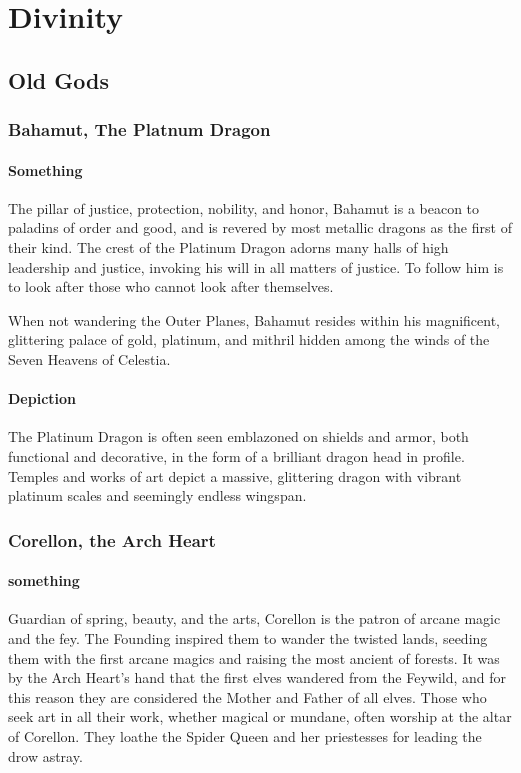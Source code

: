 \documentclass[letterpaper,twocolumn,openany,nodeprecatedcode]{dndbook}
\begin{document}

\section{Divinity}

\subsection{Old Gods}

\subsubsection{Bahamut, The Platnum Dragon}

\paragraph{Something}
The pillar of justice, protection, nobility, and honor, Bahamut is a beacon to
paladins of order and good, and is revered by most metallic dragons as the first of
their kind. The crest of the Platinum Dragon adorns many halls of high leadership and
justice, invoking his will in all matters of justice. To follow him is to look after
those who cannot look after themselves.

When not wandering the Outer Planes, Bahamut resides within his magnificent, glittering
palace of gold, platinum, and mithril hidden among the winds of the Seven Heavens of Celestia.

\paragraph{Depiction}
The Platinum Dragon is often seen emblazoned on shields and armor, both functional and
decorative, in the form of a brilliant dragon head in profile. Temples and works of art
depict a massive, glittering dragon with vibrant platinum scales and seemingly
endless wingspan.

\subsubsection{Corellon, the Arch Heart}

\paragraph{something}
Guardian of spring, beauty, and the arts, Corellon is the patron of arcane magic and
the fey. The Founding inspired them to wander the twisted lands, seeding them with the
first arcane magics and raising the most ancient of forests. It was by the Arch Heart’s
hand that the first elves wandered from the Feywild, and for this reason they are
considered the Mother and Father of all elves. Those who seek art in all their work,
whether magical or mundane, often worship at the altar of Corellon. They loathe the
Spider Queen and her priestesses for leading the drow astray.
\end{document}
